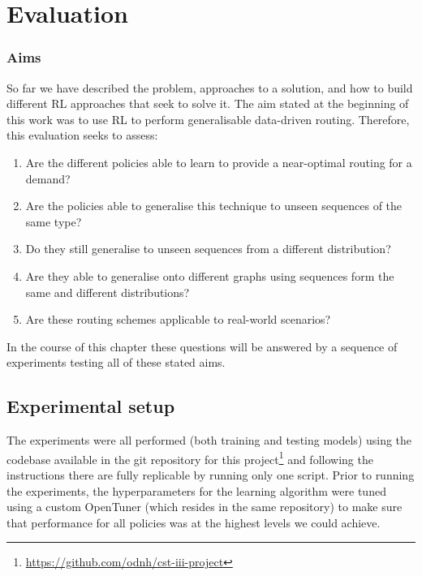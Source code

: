 \chapter{Evaluation}
\label{chapter:evaluation}

\subsection{Aims}
So far we have described the problem, approaches to a solution, and how to build different RL approaches that seek to solve it. The aim stated at the beginning of this work was to use RL to perform generalisable data-driven routing. Therefore, this evaluation seeks to assess:

\begin{enumerate}
\item Are the different policies able to learn to provide a near-optimal routing for a demand?
\item Are the policies able to generalise this technique to unseen sequences of the same type?
\item Do they still generalise to unseen sequences from a different distribution?
\item Are they able to generalise onto different graphs using sequences form the same and different distributions?
\item Are these routing schemes applicable to real-world scenarios?
\end{enumerate}

In the course of this chapter these questions will be answered by a sequence of experiments testing all of these stated aims.



\section{Experimental setup}
The experiments were all performed (both training and testing models) using the codebase available in the git repository for this project\footnote{\url{https://github.com/odnh/cst-iii-project}} and following the instructions there are fully replicable by running only one script. Prior to running the experiments, the hyperparameters for the learning algorithm were tuned using a custom OpenTuner\cite{ansel2014opentuner} (which resides in the same repository) to make sure that performance for all policies was at the highest levels we could achieve.

